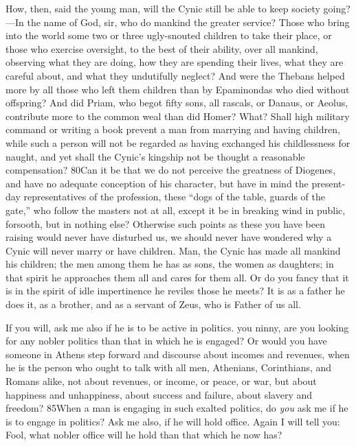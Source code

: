 How, then, said the young man, will the Cynic still be able to keep society going?—In the name of God, sir, who do mankind the greater service? Those who bring into the world some two or three ugly-snouted children to take their place, or those who exercise oversight, to the best of their ability, over all mankind, observing what they are doing, how they are spending their lives, what they are careful about, and what they undutifully neglect? And were the Thebans helped more by all those who left them children than by Epaminondas who died without offspring? And did Priam, who begot fifty sons, all rascals, or Danaus, or Aeolus, contribute more to the common weal than did Homer? What? Shall high military command or writing a book prevent a man from marrying and having children, while such a person will not be regarded as having exchanged his childlessness for naught, and yet shall the Cynic's kingship not be thought a reasonable compensation? 80Can it be that we do not perceive the greatness of Diogenes, and have no adequate conception of his character, but have in mind the present-day representatives of the profession, these ``dogs of the table, guards of the gate,'' who follow the masters not at all, except it be in breaking wind in public, forsooth, but in nothing else? Otherwise such points as these you have been raising would never have disturbed us, we should never have wondered why a Cynic will never marry or have children. Man, the Cynic has made all mankind his children; the men among them he has as sons, the women as daughters; in that spirit he approaches them all and cares for them all. Or do you fancy that it is in the spirit of idle impertinence he reviles those he meets? It is as a father he does it, as a brother, and as a servant of Zeus, who is Father of us all.

If you will, ask me also if he is to be active in politics. you ninny, are you looking for any nobler politics than that in which he is engaged? Or would you have someone in Athens step forward and discourse about incomes and revenues, when he is the person who ought to talk with all men, Athenians, Corinthians, and Romans alike, not about revenues, or income, or peace, or war, but about happiness and unhappiness, about success and failure, about slavery and freedom? 85When a man is engaging in such exalted politics, do \emph{you} ask me if he is to engage in politics? Ask me also, if he will hold office. Again I will tell you: Fool, what nobler office will he hold than that which he now has?


